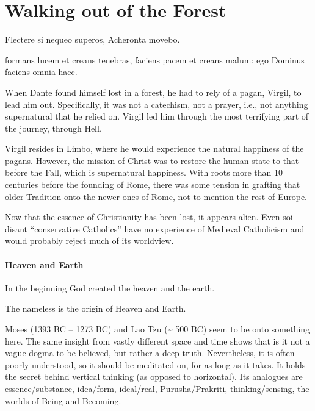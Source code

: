 \section{Walking out of the Forest}

\begin{quotex}
Flectere si nequeo superos, Acheronta movebo.

formans lucem et creans tenebras, faciens pacem et creans malum: ego Dominus faciens omnia haec.
\end{quotex}


When Dante found himself lost in a forest, he had to rely of a pagan, Virgil, to lead him out. Specifically, it was not a catechism, not a prayer, i.e., not anything supernatural that he relied on. Virgil led him through the most terrifying part of the journey, through Hell.

Virgil resides in Limbo, where he would experience the natural happiness of the pagans. However, the mission of Christ was to restore the human state to that before the Fall, which is supernatural happiness. With roots more than 10 centuries before the founding of Rome, there was some tension in grafting that older Tradition onto the newer ones of Rome, not to mention the rest of Europe.

Now that the essence of Christianity has been lost, it appears alien. Even soi-disant ``conservative Catholics'' have no experience of Medieval Catholicism and would probably reject much of its worldview.

\paragraph{Heaven and Earth}


\begin{quotex}
In the beginning God created the heaven and the earth.

The nameless is the origin of Heaven and Earth.
\end{quotex}


Moses (1393 BC -- 1273 BC) and Lao Tzu (\textasciitilde{} 500 BC) seem to be onto something here. The same insight from vastly different space and time shows that is it not a vague dogma to be believed, but rather a deep truth. Nevertheless, it is often poorly understood, so it should be meditated on, for as long as it takes. It holds the secret behind vertical thinking (as opposed to horizontal). Its analogues are essence/substance, idea/form, ideal/real, Purusha/Prakriti, thinking/sensing, the worlds of Being and Becoming.

